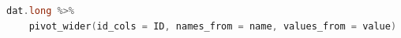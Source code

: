 \begin{lstlisting}[language=c++,label={code:usingR_pivot_wider},caption={Function to Convert to Wide Format}]
dat.long %>% 
    pivot_wider(id_cols = ID, names_from = name, values_from = value)
\end{lstlisting}
